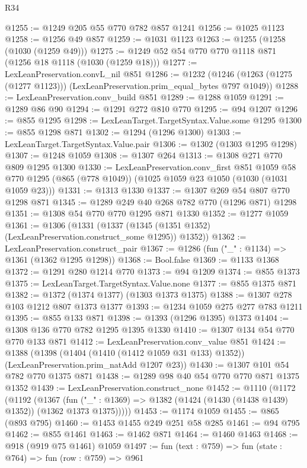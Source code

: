 \begin{lexlean}{R34}
\begin{coremodule}
@1255 := @1249 @205 @55 @770 @782 @857 @1241
@1256 := @1025 @1123
@1258 := @1256 @49 @857
@1259 := @1031 @1123
@1263 := @1255 (@1258 (@1030 (@1259 @49)))
@1275 := @1249 @52 @54 @770 @770 @1118 @871 (@1256 @18 @1118 (@1030 (@1259 @18)))
@1277 := LexLeanPreservation.convL_nil @851
@1286 := @1232
    (@1246 (@1263 (@1275 (@1277 @1123))) (LexLeanPreservation.prim_equal_bytes @797 @1049))
@1288 := LexLeanPreservation.conv_build @851
@1289 := @1288 @1059
@1291 := @1289 @86 @90
@1294 := @1291 @272 @810 @770
@1295 := @94 @1207
@1296 := @855 @1295
@1298 := LexLeanTarget.TargetSyntax.Value.some @1295
@1300 := @855 @1298 @871
@1302 := @1294 (@1296 @1300)
@1303 := LexLeanTarget.TargetSyntax.Value.pair
@1306 := @1302 (@1303 @1295 @1298)
@1307 := @1248 @1059
@1308 := @1307 @264
@1313 := @1308 @271 @770 @809 @1295 @1300
@1330 := LexLeanPreservation.conv_first
    @851
    @1059
    @58
    @770
    @1295
    (@865 (@778 @1049))
    (@1025 @1059 @23 @1050 (@1030 (@1031 @1059 @23)))
@1331 := @1313 @1330
@1337 := @1307 @269 @54 @807 @770 @1298 @871
@1345 := @1289 @249 @40 @268 @782 @770 (@1296 @871) @1298
@1351 := @1308 @54 @770 @770 @1295 @871 @1330
@1352 := @1277 @1059
@1361 := @1306
    (@1331 (@1337 (@1345 (@1351 @1352) (LexLeanPreservation.construct_some @1295)) @1352))
@1362 := LexLeanPreservation.construct_pair
@1367 := @1286 (fun ("_" : @1134) => @1361 (@1362 @1295 @1298))
@1368 := Bool.false
@1369 := @1133 @1368
@1372 := @1291 @280 @1214 @770
@1373 := @94 @1209
@1374 := @855 @1373
@1375 := LexLeanTarget.TargetSyntax.Value.none
@1377 := @855 @1375 @871
@1382 := @1372 (@1374 @1377) (@1303 @1373 @1375)
@1388 := @1307 @278 @103 @1212 @807 @1373 @1377
@1393 := @1234 @1059 @275 @277 @783 @1211
@1395 := @855 @133 @871
@1398 := @1393 (@1296 @1395) @1373
@1404 := @1308 @136 @770 @782 @1295 @1395 @1330
@1410 := @1307 @134 @54 @770 @770 @133 @871
@1412 := LexLeanPreservation.conv_value @851
@1424 := @1388
    (@1398 (@1404 (@1410 (@1412 @1059 @31 @133) @1352)) (LexLeanPreservation.prim_natAdd @1207 @23))
@1430 := @1307 @101 @54 @782 @770 @1375 @871
@1438 := @1289 @98 @40 @54 @770 @770 @871 @1375 @1352
@1439 := LexLeanPreservation.construct_none
@1452 := @1110
    (@1172
      (@1192
        (@1367
          (fun ("_" : @1369) => @1382 (@1424 (@1430 (@1438 @1439) @1352)) (@1362 @1373 @1375)))))
@1453 := @1174 @1059
@1455 := @865 (@893 @795)
@1460 := @1453 @1455 @249 @251 @58 @285
@1461 := @94 @795
@1462 := @855 @1461
@1463 := @1462 @871
@1464 := @1460 @1463
@1468 := @918 (@919 @75 @1461) @1059
@1497 := fun (text : @759) =>
  fun (state : @764) =>
  fun (row : @759) =>
  @961

\end{coremodule}
\end{lexlean}
